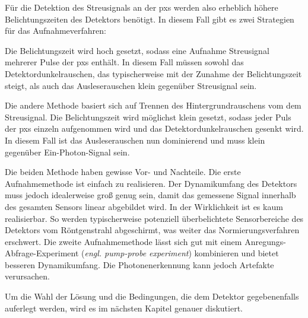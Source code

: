 \noindent
Für die Detektion des Streusignals an der \gls{pxs} werden also erheblich höhere Belichtungszeiten des Detektors benötigt. In diesem Fall gibt es zwei Strategien für das Aufnahmeverfahren:

\noindent
Die Belichtungszeit wird hoch gesetzt, sodass eine Aufnahme Streusignal mehrerer Pulse der \gls{pxs} enthält. In diesem Fall müssen sowohl das Detektordunkelrauschen, das typischerweise mit der Zunahme der Belichtungszeit steigt, als auch das Ausleserauschen klein gegenüber Streusignal sein.

\noindent
Die andere Methode basiert sich auf Trennen des Hintergrundrauschens vom dem Streusignal. Die Belichtungszeit wird möglichst klein gesetzt, sodass jeder Puls der \gls{pxs} einzeln aufgenommen wird und das Detektordunkelrauschen gesenkt wird. In diesem Fall ist das Ausleserauschen nun dominierend und muss klein gegenüber Ein-Photon-Signal sein.

\noindent
Die beiden Methode haben gewisse Vor- und Nachteile. Die erste Aufnahmemethode ist einfach zu realisieren. Der Dynamikumfang des Detektors muss jedoch idealerweise groß genug sein, damit das gemessene Signal innerhalb des gesamten Sensors linear abgebildet wird. In der Wirklichkeit ist es kaum realisierbar. So werden typischerweise potenziell überbelichtete Sensorbereiche des Detektors vom Röntgenstrahl abgeschirmt, was weiter das Normierungsverfahren erschwert. Die zweite Aufnahmemethode lässt sich gut mit einem Anregungs-Abfrage-Experiment (\emph{engl. pump-probe experiment}) kombinieren und bietet besseren Dynamikumfang. Die Photonenerkennung kann jedoch Artefakte verursachen.

\noindent
Um die Wahl der Lösung und die Bedingungen, die dem Detektor gegebenenfalls auferlegt werden, wird es im nächsten Kapitel genauer diskutiert.